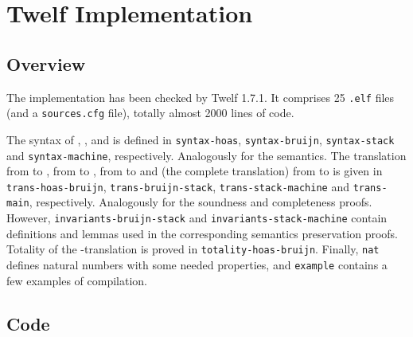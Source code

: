 \clearpage

\appendix

\section{Twelf Implementation}
\label{sec:code}

\subsection{Overview}

The implementation has been checked by Twelf 1.7.1.
It comprises 25 \texttt{.elf} files (and a \texttt{sources.cfg} file), totally almost 2000 lines of code.

The syntax of \hlang, \blang, \slang and \mlang is defined in \texttt{syntax-hoas}, \texttt{syntax-bruijn}, \texttt{syntax-stack} and \texttt{syntax-machine}, respectively.
Analogously for the semantics.
The translation from \hlang to \blang, from \blang to \slang, from \slang to \mlang and (the complete translation) from \hlang to \mlang is given in \texttt{trans-hoas-bruijn}, \texttt{trans-bruijn-stack}, \texttt{trans-stack-machine} and \texttt{trans-main}, respectively.
Analogously for the soundness and completeness proofs.
However, \texttt{invariants-bruijn-stack} and \texttt{invariants-stack-machine} contain definitions and lemmas used in the corresponding semantics preservation proofs.
Totality of the \hlang-\blang translation is proved in \texttt{totality-hoas-bruijn}.
Finally, \texttt{nat} defines natural numbers with some needed properties, and \texttt{example} contains a few examples of compilation.

\subsection{Code}
\begingroup
\makeatletter
\@totalleftmargin=-2.5cm

\endgroup
